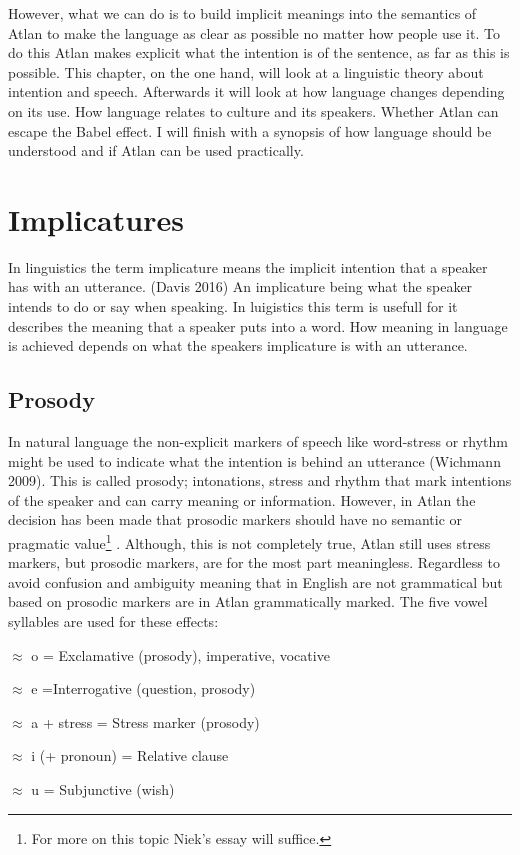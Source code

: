However, what we can do is to build implicit meanings into the semantics of Atlan to make the language as clear as possible no matter how people use it. To do this Atlan makes explicit what the intention is of the sentence, as far as this is possible. This chapter, on the one hand, will look at a linguistic theory about intention and speech. Afterwards it will look at how language changes depending on its use. How language relates to culture and its speakers. Whether Atlan can escape the Babel effect. I will finish with a synopsis of how language should be understood and if Atlan can be used practically.  

\section{Implicatures}

In linguistics the term implicature means the implicit intention that a speaker has with an utterance. (Davis 2016) An implicature being what the speaker intends to do or say when speaking. In luigistics this term is usefull for it describes the meaning that a speaker puts into a word. How meaning in language is achieved depends on what the speakers implicature is with an utterance.

\subsection{Prosody}

In natural language the non-explicit markers of speech like word-stress or rhythm might be used to indicate what the intention is behind an utterance (Wichmann 2009). This is called prosody; intonations, stress and rhythm that mark intentions of the speaker and can carry meaning or information. However, in Atlan the decision has been made that prosodic markers should have no semantic or pragmatic value\footnote{For more on this topic Niek’s essay will suffice.} . Although, this is not completely true, Atlan still uses stress markers, but prosodic markers, are for the most part meaningless. Regardless to avoid confusion and ambiguity meaning that in English are not grammatical but based on prosodic markers are in Atlan grammatically marked. The five vowel syllables are used for these effects:

\begin{itemize}
{\small
\item[\kern-0.4em\Atlano]   $\approx$ o = Exclamative (prosody), imperative, vocative 

\item[\Atlane]  $\approx$ e =Interrogative (question, prosody\footnotemark)    

\item[\Atlana]   $\approx$ a + stress = Stress marker (prosody) 

\item[\kern0.4em\Atlani]   $\approx$ i (+ pronoun) = Relative clause   

\item[\Atlanu]   $\approx$ u  = Subjunctive (wish)
	}
\end{itemize}

